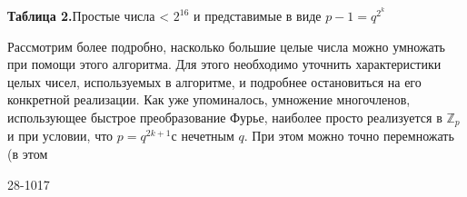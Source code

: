 \documentclass{mai_book}
\begin{document}
\begin{flushleft}
\vspace{-18pt}
\textbf{Таблица 2.}Простые числа < $2^{16}$ и представимые в виде $p - 1 = q^{2^{k}}$
\end{flushleft}
\par
Рассмотрим более подробно, насколько большие целые числа можно\linebreak
умножать при помощи этого алгоритма. Для этого необходимо \linebreak
уточнить характеристики целых чисел, используемых в алгоритме, и \linebreak
подробнее остановиться на его конкретной реализации. Как уже \linebreak
упоминалось, умножение многочленов, использующее быстрое \linebreak
преобразование Фурье, наиболее просто реализуется в $\mathbb{Z}_p$ и при условии, что $p = q^{2k+1}$с нечетным $q$. При этом можно точно перемножать (в этом\linebreak 
\begin{flushleft}
\tiny
28-1017
\end{flushleft}
\pagebreak
\newpage

\end{document}
